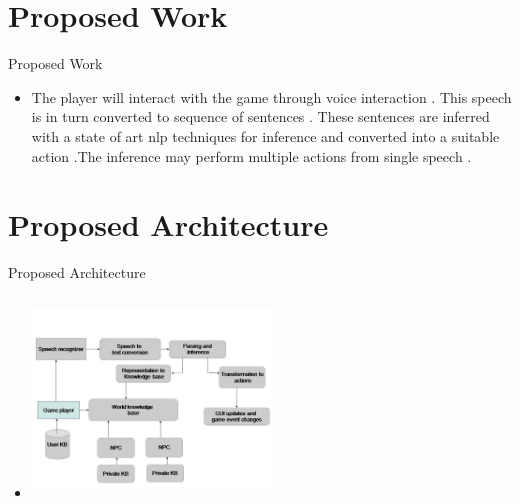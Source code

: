 \documentclass{beamer}
\begin{document}
\section{Proposed Work}
\begin{frame}{Proposed Work}
\small
\begin{itemize}
\item
The player will interact with the game through voice interaction . This speech is in turn converted to sequence of sentences . These sentences are inferred with a state of art nlp techniques for inference and converted into a suitable action .The inference may perform multiple actions from single speech .

\end{itemize}

\end{frame}

\section{Proposed Architecture}
\begin{frame}{Proposed Architecture}
\small
\begin{itemize}
\item
\hspace{2cm}
\includegraphics[height=2.1in,width=2.5in]{architecture.jpg}
\end{itemize}

\end{frame}
\end{document}

